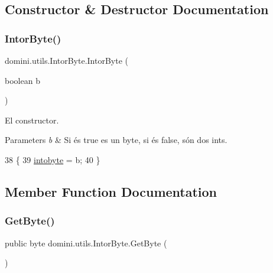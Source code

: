 \subsection{Constructor \& Destructor Documentation}
\mbox{\label{classdomini_1_1utils_1_1IntorByte_ac2bae675cf6c4d8880acedeefaf24060}} 
\subsubsection{\texorpdfstring{Intor\+Byte()}{IntorByte()}}
{\footnotesize\ttfamily domini.\+utils.\+Intor\+Byte.\+Intor\+Byte (\begin{DoxyParamCaption}\item[{boolean}]{b }\end{DoxyParamCaption})\hspace{0.3cm}{\ttfamily [inline]}}



El constructor. 


\begin{DoxyParams}{Parameters}
{\em b} & Si és true es un byte, si és false, són dos int\textquotesingle{}s. \\
\hline
\end{DoxyParams}

\begin{DoxyCode}
38    \{
39       \hyperlink{classdomini_1_1utils_1_1IntorByte_aee013881ecae778d25cab7c0b7655528}{intobyte} = b;
40    \}
\end{DoxyCode}


\subsection{Member Function Documentation}
\mbox{\label{classdomini_1_1utils_1_1IntorByte_afd907b7001011bbca374605fb11491f4}} 
\subsubsection{\texorpdfstring{Get\+Byte()}{GetByte()}}
{\footnotesize\ttfamily public byte domini.\+utils.\+Intor\+Byte.\+Get\+Byte (\begin{DoxyParamCaption}{ }\end{DoxyParamCaption})\hspace{0.3cm}{\ttfamily [inline]}}



